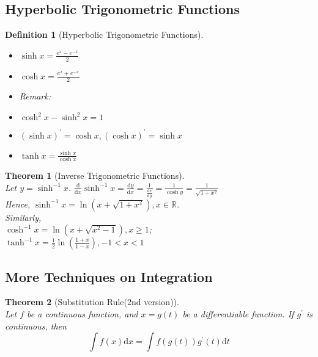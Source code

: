 \documentclass[12pt]{article}
\newcommand{\diff}{\mathrm{d}}
\newtheorem{definition}{Definition}[section]
\newtheorem{theorem}{Theorem}[section]
\theoremstyle{definition}
\begin{document}
\subsection{Hyperbolic Trigonometric Functions}
\begin{definition}[Hyperbolic Trigonometric Functions]
\hfill\\
\normalfont 
\begin{itemize}
\item $\sinh x = \frac{e^x-e^{-x}}{2}$
\item $\cosh x = \frac{e^x+e^{-x}}{2}$
\item[] Remark:
\item[] $\cosh^2 x -\sinh^2 x = 1$
\item[] $(\sinh x)^\prime = \cosh x, (\cosh x)^\prime = \sinh x$
\item $\tanh x = \frac{\sinh x}{\cosh x}$
\end{itemize}
\end{definition}
\begin{theorem}[Inverse Trigonometric Functions]
\hfill\\
\normalfont Let $y = \sinh^{-1} x$. $\frac{\diff}{\diff x}\sinh^{-1} x =\frac{\diff y}{\diff x} = \frac{1}{\frac{\diff x}{\diff y}} = \frac{1}{\cosh y} = \frac{1}{\sqrt{1+x^2}}$\\
Hence, $\sinh^{-1} x = \ln(x+\sqrt{1+x^2}), x\in\mathbb{R}$.\\
Similarly,\\
 $\cosh^{-1} x = \ln(x+\sqrt{x^2-1}), x\geq 1$; \\
 $\tanh^{-1} x = \frac{1}{2}\ln\left(\frac{1+x}{1-x}\right),-1<x<1$
\end{theorem}
\subsection{More Techniques on Integration}
\begin{theorem}[Substitution Rule(2nd version)]
\hfill\\
\normalfont Let $f$ be a continuous function, and $x=g(t)$ be a differentiable function. If $g^\prime$ is continuous, then
\[
\int f(x)\diff x = \int f(g(t))g^\prime(t)\diff t
\]
\end{theorem}
\end{document}
